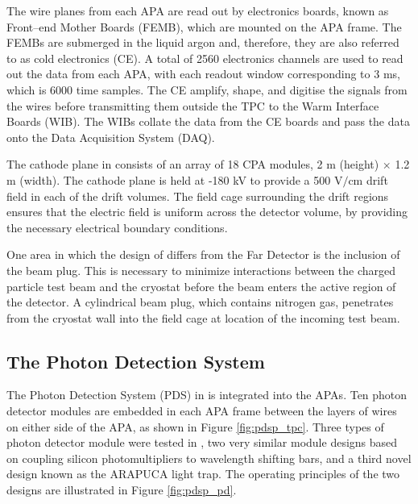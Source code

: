 The wire planes from each APA are read out by electronics boards, known as
Front--end Mother Boards (FEMB), which are mounted on the APA frame. The FEMBs 
are submerged in the liquid argon and, therefore, they are also referred to as 
cold electronics (CE). A total of 2560 electronics channels are used to read 
out the data from each APA, with each readout window corresponding to 3 ms, 
which is 6000 time samples. The CE amplify, shape, and digitise the signals 
from the wires before transmitting them outside the TPC to the Warm Interface 
Boards (WIB). The WIBs collate the data from the CE boards and pass the data 
onto the Data Acquisition System (DAQ).

The cathode plane in \protodune{} consists of an array of 18 CPA modules, 2 m 
(height) $\times$ 1.2 m (width). The cathode plane is held at -180 kV to 
provide a 500 $\mbox{V/cm}$ drift field in each of the drift volumes. The 
field cage surrounding the drift regions ensures that the electric field is 
uniform across the detector volume, by providing the necessary electrical
boundary conditions.

One area in which the design of \protodune{} differs from the Far Detector is
the inclusion of the beam plug. This is necessary to minimize interactions
between the charged particle test beam and the cryostat before the beam enters 
the active region of the detector. A cylindrical beam plug, which contains 
nitrogen gas, penetrates from the cryostat wall into the field cage at 
location of the incoming test beam. 

\subsection{The Photon Detection System}

The Photon Detection System (PDS) in \protodune{} is integrated into the APAs. 
Ten photon detector modules are embedded in each APA frame between the layers 
of wires on either side of the APA, as shown in Figure \ref{fig:pdsp_tpc}. 
Three types of photon detector module were tested in \protodune{}, two very 
similar module designs based on coupling silicon photomultipliers to 
wavelength shifting bars, and a third novel design known as the ARAPUCA light 
trap. The operating principles of the two designs are illustrated in Figure 
\ref{fig:pdsp_pd}.

